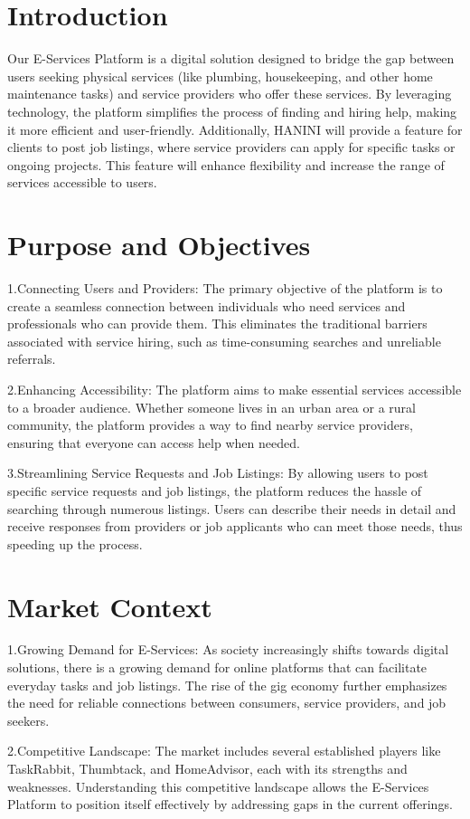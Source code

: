 \documentclass[12pt,a4paper]{report}
\begin{document}
\section{Introduction}
Our E-Services Platform is a digital solution designed to bridge the gap between users seeking physical services (like plumbing, housekeeping, and other home maintenance tasks) and service providers who offer these services. By leveraging technology, the platform simplifies the process of finding and hiring help, making it more efficient and user-friendly. Additionally, HANINI will provide a feature for clients to post job listings, where service providers can apply for specific tasks or ongoing projects. This feature will enhance flexibility and increase the range of services accessible to users.
\section{Purpose and Objectives}
1.Connecting Users and Providers: The primary objective of the platform is to create a seamless connection between individuals who need services and professionals who can provide them. This eliminates the traditional barriers associated with service hiring, such as time-consuming searches and unreliable referrals.

2.Enhancing Accessibility: The platform aims to make essential services accessible to a broader audience. Whether someone lives in an urban area or a rural community, the platform provides a way to find nearby service providers, ensuring that everyone can access help when needed.

3.Streamlining Service Requests and Job Listings: By allowing users to post specific service requests and job listings, the platform reduces the hassle of searching through numerous listings. Users can describe their needs in detail and receive responses from providers or job applicants who can meet those needs, thus speeding up the process.
\section{Market Context}
1.Growing Demand for E-Services: As society increasingly shifts towards digital solutions, there is a growing demand for online platforms that can facilitate everyday tasks and job listings. The rise of the gig economy further emphasizes the need for reliable connections between consumers, service providers, and job seekers.

2.Competitive Landscape: The market includes several established players like TaskRabbit, Thumbtack, and HomeAdvisor, each with its strengths and weaknesses. Understanding this competitive landscape allows the E-Services Platform to position itself effectively by addressing gaps in the current offerings.
\end{document}
